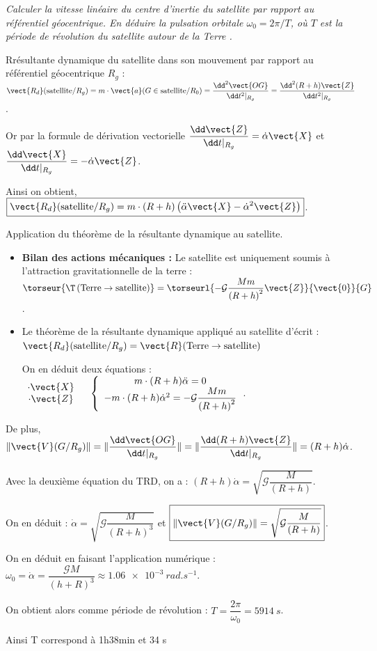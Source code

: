 \question{\label{q_3}}\textit{Calculer la vitesse linéaire du centre d'inertie du satellite par
  rapport au référentiel géocentrique. En déduire la pulsation orbitale
$\omega_0=2\pi/T$, où $T$ est la période de révolution du satellite autour de la Terre .}
\ifprof
\begin{corrige}
Rrésultante dynamique du satellite dans son mouvement par rapport au référentiel géocentrique $R_g$ :
$\vect{R_d}(\text{satellite}/R_g)=m\cdot \vect{a}(G\in \text{satellite}/R_0)=\dfrac{\dd^2\vect{OG}}{\dd t^2\vert_{R_g}} =\dfrac{\dd^2(R+h)\vect{Z}}{\dd t^2\vert_{R_g}}$.

Or par la formule de dérivation vectorielle
$ \dfrac{\dd\vect{Z}}{\dd t\vert_{R_g}}=\dot{\alpha}\vect{X}$ 
et $\dfrac{\dd\vect{X}}{\dd t\vert_{R_g}}=-\dot{\alpha}\vect{Z}$.

Ainsi on obtient,
$
\boxed{
\vect{R_d}(\text{satellite}/R_g)=m\cdot (R+h)\left(\ddot{\alpha}\vect{X}-\dot{\alpha}^2\vect{Z}\right)
}$.

Application du théorème de la résultante dynamique au satellite.
\begin{itemize}
\item \textbf{Bilan des actions mécaniques :}
Le satellite est uniquement soumis à l'attraction gravitationnelle de la terre : 
$
\torseur{\T\left(\text{Terre}\to \text{satellite}\right)}=\torseurl{-\mathcal{G}\dfrac{Mm}{\left(R+h\right)^2}\vect{Z}}{\vect{0}}{G}$.
\item Le théorème de la résultante dynamique appliqué au satellite d'écrit : 
$\vect{R_d}(\text{satellite}/R_g)=\vect{R}(\text{Terre} \to \text{satellite})$

On en déduit deux équations : 
$
\begin{array}{c}
\cdot \vect{X}\\
\cdot \vect{Z}\\
\end{array}
\quad 
\left\{
\begin{array}{c}
m\cdot (R+h)\ddot{\alpha}=0\\
-m\cdot (R+h)\dot{\alpha}^2=-\mathcal{G}\dfrac{Mm}{\left(R+h\right)^2}\\
\end{array}
\right.
$.
\end{itemize}


De plus, $\Vert\vect{V}(G/R_g)\Vert=\Vert\dfrac{\dd\vect{OG}}{\dd t\vert_{R_g}}\Vert
=\Vert\dfrac{\dd (R+h)\vect{Z}}{\dd t\vert_{R_g}}\Vert=(R+h)\dot{\alpha}
$.

Avec la deuxième équation du TRD, on a : $(R+h)\dot{\alpha}=\sqrt{\mathcal{G}\dfrac{M}{\left(R+h\right)}}$.


On en déduit :  $ \boxed{\dot{\alpha}=\sqrt{\mathcal{G}\dfrac{M}{\left(R+h\right)^3}}}$
et 
$\boxed{ \Vert\vect{V}(G/R_g)\Vert=\sqrt{\mathcal{G}\dfrac{M}{\left(R+h\right)}}}$.


On en déduit en faisant l'application numérique : 
$\omega_0=\dot{\alpha}=\dfrac{\mathcal{G}M}{\left(h+R\right)^3}\approx\SI{1,06e-3}{rad.s^{-1}}$.


On obtient alors comme période de révolution :  $T=\dfrac{2\pi}{\omega_0}=\SI{5914}{s}$.

Ainsi T correspond à 1h38min et 34 s

\end{corrige}

